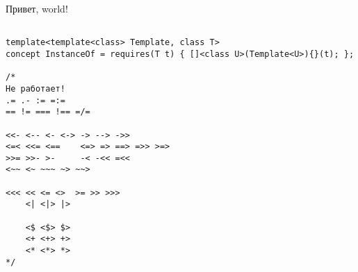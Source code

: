 \documentclass[11pt,twoside,openany]{book}
\begin{document}
Привет, world!

\begin{lstlisting}

template<template<class> Template, class T>
concept InstanceOf = requires(T t) { []<class U>(Template<U>){}(t); };

/*
Не работает!
.= .- := =:=
== != === !== =/=

<<- <-- <- <-> -> --> ->>
<=< <<= <==    <=> => ==> =>> >=>
>>= >>- >-     -< -<< =<<
<~~ <~ ~~~ ~> ~~>

<<< << <= <>  >= >> >>>
    <| <|> |>

    <$ <$> $>
    <+ <+> +>
    <* <*> *>
*/
\end{lstlisting}
  
\end{document}
